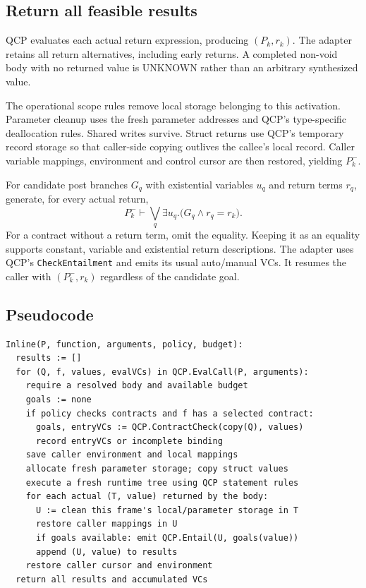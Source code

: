 \documentclass[10pt]{article}
\begin{document}
\subsection{Return all feasible results}
QCP evaluates each actual return expression, producing $(P_k,r_k)$.
The adapter retains all return alternatives, including early returns.
A completed non-void body with no returned value is UNKNOWN rather than an
arbitrary synthesized value.

The operational scope rules remove local storage belonging to this activation.
Parameter cleanup uses the fresh parameter addresses and QCP's type-specific
deallocation rules. Shared writes survive. Struct returns use QCP's temporary
record storage so that caller-side copying outlives the callee's local record.
Caller variable mappings, environment and control cursor are then restored,
yielding $P_k^-$.

For candidate post branches $G_q$ with existential variables $u_q$ and return
terms $r_q$, generate, for every actual return,
\[
 P_k^-\vdash\bigvee_q\exists u_q.\bigl(G_q\land r_q=r_k\bigr).
\]
For a contract without a return term, omit the equality. Keeping it as an
equality supports constant, variable and existential return descriptions.
The adapter uses QCP's \texttt{CheckEntailment} and emits its usual auto/manual
VCs. It resumes the caller with $(P_k^-,r_k)$ regardless of the candidate goal.

\subsection{Pseudocode}
\begin{lstlisting}[basicstyle=\ttfamily\small,frame=single]
Inline(P, function, arguments, policy, budget):
  results := []
  for (Q, f, values, evalVCs) in QCP.EvalCall(P, arguments):
    require a resolved body and available budget
    goals := none
    if policy checks contracts and f has a selected contract:
      goals, entryVCs := QCP.ContractCheck(copy(Q), values)
      record entryVCs or incomplete binding
    save caller environment and local mappings
    allocate fresh parameter storage; copy struct values
    execute a fresh runtime tree using QCP statement rules
    for each actual (T, value) returned by the body:
      U := clean this frame's local/parameter storage in T
      restore caller mappings in U
      if goals available: emit QCP.Entail(U, goals(value))
      append (U, value) to results
    restore caller cursor and environment
  return all results and accumulated VCs
\end{lstlisting}
\end{document}
